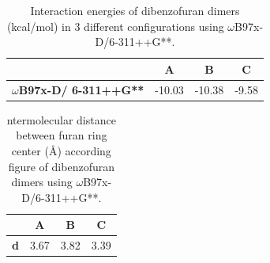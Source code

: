 \begin{table}[htbp]
	\caption{Interaction energies of dibenzofuran dimers (kcal/mol) in 3 different configurations using $\omega$B97x-D/6-311++G**.}
		\begin{center}
	\begin{tabular}{cccc}
		\toprule
		& \textbf{A} & \textbf{B} & \textbf{C} \\ 
		\midrule
		\textbf{$\omega$B97x-D/
		6-311++G** }& -10.03	& -10.38	& -9.58	\\ 
	\bottomrule
	\end{tabular}
\end{center}
	\label{}
\end{table}


\begin{table}[htbp]
	\caption{ntermolecular distance between furan ring center (Å) according figure of dibenzofuran dimers using $\omega$B97x-D/6-311++G**.}
	\begin{center}
		\begin{tabular}{cccc}
			\toprule
			& \textbf{A} & \textbf{B} & \textbf{C} \\ 
			\midrule
			\textbf{d}& 3.67	& 3.82	& 3.39\\ 
			\bottomrule
		\end{tabular}
	\end{center}
	\label{}
\end{table}



